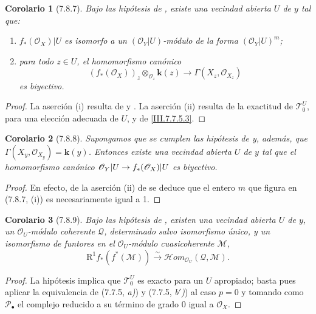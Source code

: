 \documentclass[10pt,oneside,openany]{book}
\theoremstyle{egaenv}\newtheorem*{env}{---}
\theoremstyle{egastatement}
\newtheorem*{corollary}{Corolario}
\theoremstyle{egadescription}
\renewcommand{\to}{\mathchoice{\longrightarrow}{\rightarrow}{\rightarrow}{\rightarrow}}
\begin{document}
\begin{corollary}[7.8.7]
\label{III.7.8.7}
Bajo las hipótesis de \textup{}, existe una vecindad abierta
$U$ de $y$ tal que:
\begin{enumerate}
  \item[\textup{(i)}] $f_*(\mathscr O_X)|U$ es isomorfo a un
    $(\mathscr O_Y|U)$-módulo de la forma $(\mathscr O_Y|U)^m$;
  \item[\textup{(ii)}] para todo $z\in U$, el homomorfismo canónico
    \[
      (f_*(\mathscr O_X))_z
      \otimes_{\mathscr O_z}\boldsymbol{k}(z)
      \longrightarrow
      \Gamma(X_z,\mathscr O_{X_z})
    \]
    es biyectivo.
\end{enumerate}
\end{corollary}

\begin{proof}
La aserción (i) resulta de  y .
La aserción (ii) resulta de la exactitud de $\mathscr T_0^U$, para
una elección adecuada de $U$, y de \eqref{III.7.7.5.3}.
\end{proof}

\begin{corollary}[7.8.8]
\label{III.7.8.8}
Supongamos que se cumplen las hipótesis de \textup{} y,
además, que
$\Gamma(X_y,\mathscr O_{X_y})=\boldsymbol{k}(y)$.
Entonces existe una vecindad abierta $U$ de $y$ tal que el
homomorfismo canónico
$\mathscr O_Y|U\to f_*(\mathscr O_X)|U$
es biyectivo.
\end{corollary}

\begin{proof}
En efecto, de la aserción (ii) de  se deduce que el
entero $m$ que figura en (7.8.7,
(i)) es necesariamente igual a 1.
\end{proof}

\begin{corollary}[7.8.9]
\label{III.7.8.9}
Bajo las hipótesis de \textup{}, existen una vecindad abierta
$U$ de $y$, un $\mathscr O_U$-módulo coherente $\mathscr Q$,
determinado salvo isomorfismo único, y un isomorfismo de funtores en
el $\mathscr O_U$-módulo cuasicoherente $\mathscr M$,
\[
  \mathrm R^1f_*(f^*(\mathscr M))
  \xrightarrow{\sim}
  \mathscr{H}\!om_{\mathscr O_U}(\mathscr Q,\mathscr M).
  \tag{7.8.9.1}\label{III.7.8.9.1.fr}
\]
\end{corollary}

\begin{proof}
La hipótesis implica que $\mathscr T_0^U$ es exacto para un $U$
apropiado; basta pues aplicar la equivalencia de (7.7.5, \emph{a)}) y
(7.7.5, \emph{b$'$)}) al caso $p=0$ y tomando como
$\mathscr P_\bullet$ el complejo
reducido a su término de grado 0 igual a $\mathscr O_X$.
\end{proof}
\end{document}
